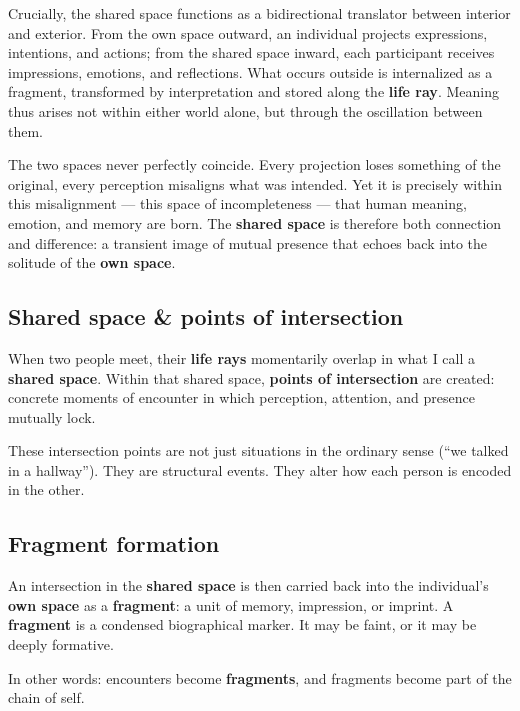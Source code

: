 Crucially, the shared space functions as a bidirectional translator between interior and exterior.
From the own space outward, an individual projects expressions, intentions, and actions;
from the shared space inward, each participant receives impressions, emotions, and reflections.
What occurs outside is internalized as a fragment, transformed by interpretation and stored along the \textbf{life ray}.
Meaning thus arises not within either world alone, but through the oscillation between them.

The two spaces never perfectly coincide.
Every projection loses something of the original, every perception misaligns what was intended.
Yet it is precisely within this misalignment — this space of incompleteness — that human meaning, emotion, and memory are born.
The \textbf{shared space} is therefore both connection and difference:
a transient image of mutual presence that echoes back into the solitude of the \textbf{own space}.


\subsection{Shared space \& points of intersection}

When two people meet, their \textbf{life rays} momentarily overlap in what I call a \textbf{shared space}.
Within that shared space, \textbf{points of intersection} are created:
concrete moments of encounter in which perception, attention, and presence mutually lock.

These intersection points are not just situations in the ordinary sense (``we talked in a hallway'').
They are structural events. They alter how each person is encoded in the other.

\subsection{Fragment formation}

An intersection in the \textbf{shared space} is then carried back into the individual's
\textbf{own space} as a \textbf{fragment}: a unit of memory, impression, or imprint.
A \textbf{fragment} is a condensed biographical marker.
It may be faint, or it may be deeply formative.

In other words: encounters become \textbf{fragments}, and fragments become part of the chain of self.

